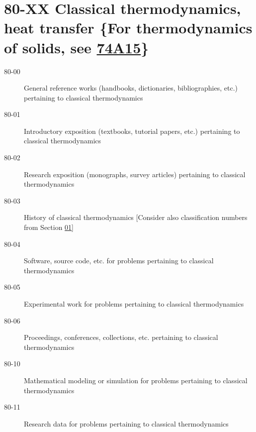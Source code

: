 \section*{80-XX Classical thermodynamics, heat transfer \{For thermodynamics of solids, see \hyperref[74A15]{74A15}\} }\label{80-XX}
\begin{description}
\item [80-00]\label{80-00} General reference works (handbooks, dictionaries, bibliographies, etc.) pertaining to classical thermodynamics
\item [80-01]\label{80-01} Introductory exposition (textbooks, tutorial papers, etc.) pertaining to classical thermodynamics
\item [80-02]\label{80-02} Research exposition (monographs, survey articles) pertaining to classical thermodynamics
\item [80-03]\label{80-03} History of classical thermodynamics [Consider also classification numbers from Section \hyperref[01-XX]{01}]
\item [80-04]\label{80-04} Software, source code, etc. for problems pertaining to classical thermodynamics
\item [80-05]\label{80-05} Experimental work for problems pertaining to classical thermodynamics
\item [80-06]\label{80-06} Proceedings, conferences, collections, etc. pertaining to classical thermodynamics
\item [80-10]\label{80-10} Mathematical modeling or simulation for problems pertaining to classical thermodynamics
\item [80-11]\label{80-11} Research data for problems pertaining to classical thermodynamics
\end{description}
